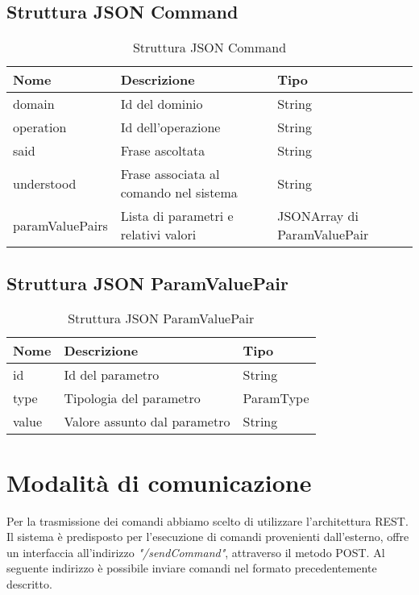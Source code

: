 \documentclass[twoside]{supsistudent}
\begin{document}
\subsection{Struttura JSON Command}
\begin{table}[H]
\centering
\caption{Struttura JSON Command}
\label{Struttura JSON Command}
\begin{tabular}{|l|l|l|}
\hline
Nome            & Descrizione                            & Tipo                        \\ \hline
domain          & Id del dominio                         & String                      \\ \hline
operation       & Id dell'operazione                     & String                      \\ \hline
said            & Frase ascoltata                        & String                      \\ \hline
understood      & Frase associata al comando nel sistema & String                      \\ \hline
paramValuePairs & Lista di parametri e relativi valori   & JSONArray di ParamValuePair \\ \hline
\end{tabular}
\end{table}
\subsection{Struttura JSON ParamValuePair}
\begin{table}[H]
\centering
\caption{Struttura JSON ParamValuePair}
\label{Struttura JSON ParamValuePair}
\begin{tabular}{|l|l|l|}
\hline
Nome  & Descrizione                  & Tipo      \\ \hline
id    & Id del parametro             & String    \\ \hline
type  & Tipologia del parametro      & ParamType \\ \hline
value & Valore assunto dal parametro & String    \\ \hline
\end{tabular}
\end{table}
\section{Modalità di comunicazione}
Per la trasmissione dei comandi abbiamo scelto di utilizzare l'architettura REST.
Il sistema è predisposto per l'esecuzione di comandi provenienti dall'esterno, offre un interfaccia all'indirizzo  \textit{"/sendCommand"}, attraverso il metodo POST.
Al seguente indirizzo è possibile inviare comandi nel formato precedentemente descritto.
\end{document}
